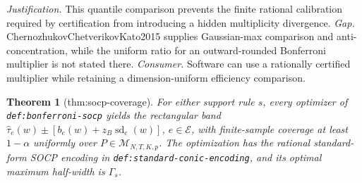 \documentclass{article}
\newtheorem{theorem}{Theorem}
\begin{document}
\par\smallskip\noindent \textit{Justification.} This quantile comparison prevents the finite rational calibration required by certification from introducing a hidden multiplicity divergence. \textit{Gap.} ChernozhukovChetverikovKato2015 supplies Gaussian-max comparison and anti-concentration, while the uniform ratio for an outward-rounded Bonferroni multiplier is not stated there. \textit{Consumer.} Software can use a rationally certified multiplier while retaining a dimension-uniform efficiency comparison.

\begin{theorem}[thm:socp-coverage]\label{thm:socp-coverage}
For either support rule \(s\), every optimizer of \texttt{def:bonferroni-socp} yields the rectangular band \(\widehat\tau_e(w)\pm[b_e(w)+z_B\operatorname{sd}_e(w)]\), \(e\in\mathcal E\), with finite-sample coverage at least \(1-\alpha\) uniformly over \(P\in\mathcal M_{N,T,K,p}\). The optimization has the rational standard-form SOCP encoding in \texttt{def:standard-conic-encoding}, and its optimal maximum half-width is \(\Gamma_s\).
\end{theorem}
\end{document}
